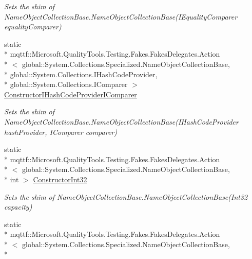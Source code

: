 \begin{DoxyCompactItemize}
\begin{DoxyCompactList}\small\item\em Sets the shim of Name\-Object\-Collection\-Base.\-Name\-Object\-Collection\-Base(\-I\-Equality\-Comparer equality\-Comparer)\end{DoxyCompactList}\item 
static \\*
mqttf\-::\-Microsoft.\-Quality\-Tools.\-Testing.\-Fakes.\-Fakes\-Delegates.\-Action\\*
$<$ global\-::\-System.\-Collections.\-Specialized.\-Name\-Object\-Collection\-Base, \\*
global\-::\-System.\-Collections.\-I\-Hash\-Code\-Provider, \\*
global\-::\-System.\-Collections.\-I\-Comparer $>$ \hyperlink{class_system_1_1_collections_1_1_specialized_1_1_fakes_1_1_shim_name_object_collection_base_a2ef44c9a5146ae87a5c88b536f427b93}{Constructor\-I\-Hash\-Code\-Provider\-I\-Comparer}
\begin{DoxyCompactList}\small\item\em Sets the shim of Name\-Object\-Collection\-Base.\-Name\-Object\-Collection\-Base(\-I\-Hash\-Code\-Provider hash\-Provider, I\-Comparer comparer)\end{DoxyCompactList}\item 
static \\*
mqttf\-::\-Microsoft.\-Quality\-Tools.\-Testing.\-Fakes.\-Fakes\-Delegates.\-Action\\*
$<$ global\-::\-System.\-Collections.\-Specialized.\-Name\-Object\-Collection\-Base, \\*
int $>$ \hyperlink{class_system_1_1_collections_1_1_specialized_1_1_fakes_1_1_shim_name_object_collection_base_aaede6d3c8b029b6d347c26a8aa60944c}{Constructor\-Int32}
\begin{DoxyCompactList}\small\item\em Sets the shim of Name\-Object\-Collection\-Base.\-Name\-Object\-Collection\-Base(\-Int32 capacity)\end{DoxyCompactList}\item 
static \\*
mqttf\-::\-Microsoft.\-Quality\-Tools.\-Testing.\-Fakes.\-Fakes\-Delegates.\-Action\\*
$<$ global\-::\-System.\-Collections.\-Specialized.\-Name\-Object\-Collection\-Base, \\*

\end{DoxyCompactItemize}
